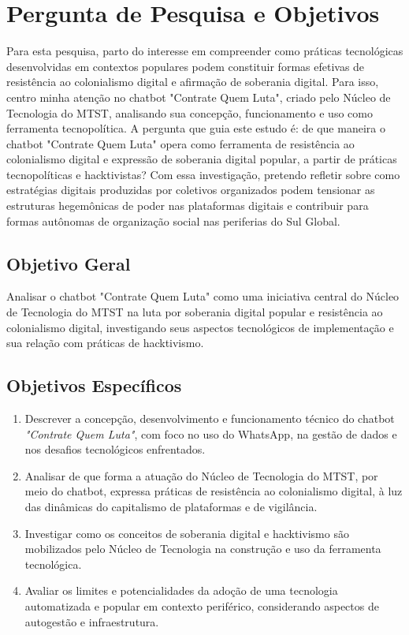 \section{Pergunta de Pesquisa e Objetivos}
\label{sec:perg}
Para esta pesquisa, parto do interesse em compreender como práticas tecnológicas desenvolvidas em contextos populares podem constituir formas efetivas de resistência ao colonialismo digital e afirmação de soberania digital. Para isso, centro minha atenção no chatbot "Contrate Quem Luta", criado pelo Núcleo de Tecnologia do MTST, analisando sua concepção, funcionamento e uso como ferramenta tecnopolítica. A pergunta que guia este estudo é: de que maneira o chatbot "Contrate Quem Luta" opera como ferramenta de resistência ao colonialismo digital e expressão de soberania digital popular, a partir de práticas tecnopolíticas e hacktivistas? Com essa investigação, pretendo refletir sobre como estratégias digitais produzidas por coletivos organizados podem tensionar as estruturas hegemônicas de poder nas plataformas digitais e contribuir para formas autônomas de organização social nas periferias do Sul Global.

\subsection{Objetivo Geral}
\label{subsec:objEs}

Analisar o chatbot "Contrate Quem Luta" como uma iniciativa central do Núcleo de Tecnologia do MTST na luta por soberania digital popular e resistência ao colonialismo digital, investigando seus aspectos tecnológicos de implementação e sua relação com práticas de hacktivismo.

\subsection{Objetivos Específicos}
\label{subsec:objEs}

\begin{enumerate}
    \item Descrever a concepção, desenvolvimento e funcionamento técnico do chatbot \textit{"Contrate Quem Luta"}, com foco no uso do WhatsApp, na gestão de dados e nos desafios tecnológicos enfrentados.
    
    \item Analisar de que forma a atuação do Núcleo de Tecnologia do MTST, por meio do chatbot, expressa práticas de resistência ao colonialismo digital, à luz das dinâmicas do capitalismo de plataformas e de vigilância.
    
    \item Investigar como os conceitos de soberania digital e hacktivismo são mobilizados pelo Núcleo de Tecnologia na construção e uso da ferramenta tecnológica.
    
    \item Avaliar os limites e potencialidades da adoção de uma tecnologia automatizada e popular em contexto periférico, considerando aspectos de autogestão e infraestrutura.
\end{enumerate}


